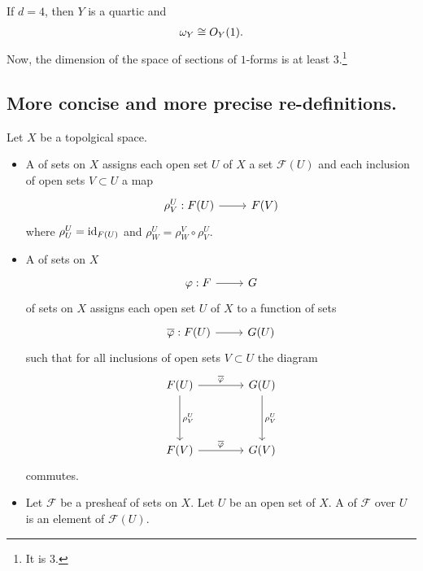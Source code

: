 \documentclass [11 pt, oneside] {article}
\begin{document}
If $d=4$, then $Y$ is a quartic and 
\begin{align*}
	\omega_Y \cong \relax{O}_Y(1).
\end{align*}
Now, the dimension of the space of sections of $1$-forms is at least $3$.\footnote{It is $3$.} 

\subsection{More concise and more precise re-definitions.}
\begin{definition}\label{}\text{}
Let $X$ be a topolgical space. 
\begin{itemize}
	\item A  of sets on $X$ assigns each open set $U$ of $X$ a set $\mathscr{F}(U)$ and each inclusion of open sets $V\subset U$ a map
\[
\begin{tikzcd}
	\rho_{V}^{U} : \mathscr{F}(U)\ar[r]&  \mathscr{F}(V)
\end{tikzcd}
\]
where $\rho_{U}^{U} = \operatorname{id}_{\relax{F}(U)}$ and $\rho_{W}^{U} = \rho_{W}^{V}\circ \rho_{V}^{U}$.

\item A  of sets on $X$ 
\[
\begin{tikzcd}
	\varphi:\mathscr{F}\ar[r]& \mathscr{G}
\end{tikzcd}
\]
of sets on $X$ assigns each open set $U$ of $X$ to a function of sets
\[
\begin{tikzcd}
	\overline{\varphi} : \mathscr{F}(U)\ar[r]&  \mathscr{G}(U)
\end{tikzcd}
\]
such that for all inclusions of open sets $V\subset U$ the diagram
\[
\begin{tikzcd}[sep = 4 em]
	\mathscr{F}(U)\ar[r,"\overline{\varphi}"] \ar[d,"\rho_{V}^{U}" ] & \mathscr{G}(U)\ar[d,"\rho_{V}^{U}" ]\\
	\mathscr{F}(V)\ar[r,"\overline{\varphi}"] &  \mathscr{G}(V)
\end{tikzcd}
\]
commutes.
\item Let $\mathscr{F}$ be a presheaf of sets on $X$. Let $U$ be an open set of $X$. A  of $\mathscr{F}$ over $U$ is an element of $\mathscr{F}(U)$.
\end{itemize}
\end{definition}
\end{document}
